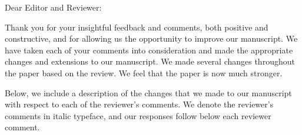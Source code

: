 \documentclass[8pt]{letter} %
\begin{document}
\let\raggedleft\raggedright                %

\newcommand{\response}[1]{{\bf Response.} #1}

\newcommand{\comment}[2]{
  \stepcounter{commentCounter}
  \vspace{2em}
  {\bf Comment R#1.\arabic{commentCounter}.} {\em #2}
  }
 
\begin{letter}{}

\address{
Weiyi Shang\\
EV 3.129, 1515 Ste. Catherine Street West\\
Department of Computer Science and Software Engineering, Concordia University\\ 
Montreal, QC, Canada H3G 1M8 \\
1 514-848-2424 ext. 7801\\
} 

\opening{Dear Editor and Reviewer:} 
 
\noindent Thank you for your insightful feedback and comments, both positive and constructive, and for allowing us the opportunity to improve our manuscript. We have taken each of your comments into consideration and made the appropriate changes and extensions to our manuscript. We made several changes throughout the paper based on the review. We feel that the paper is now much stronger.



Below, we include a description of the changes that we made to our manuscript with respect to each of the reviewer's comments. We denote the reviewer's comments in italic typeface, and our responses follow below each reviewer comment.




\vspace{2em}


\end{letter}
\end{document}

